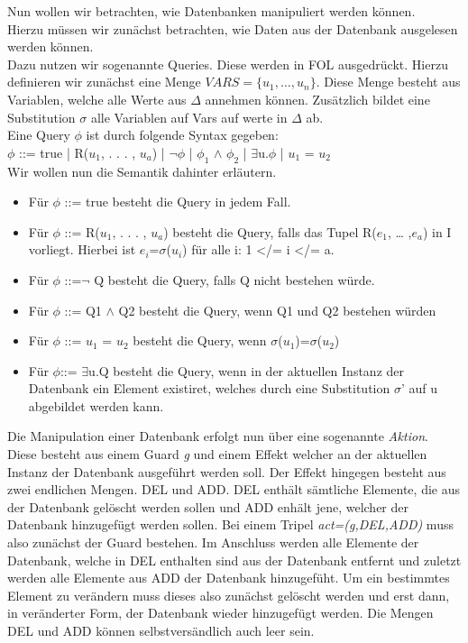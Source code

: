 Nun wollen wir betrachten, wie Datenbanken manipuliert werden können.\\
Hierzu müssen wir zunächst betrachten, wie Daten aus der Datenbank ausgelesen werden können.\\
Dazu nutzen wir sogenannte Queries. Diese werden in FOL ausgedrückt. Hierzu definieren wir zunächst eine Menge $VARS = \{u_1,…,u_n\}$. Diese Menge besteht aus Variablen, welche alle Werte aus ${\Delta}$ annehmen können. Zusätzlich bildet eine Substitution ${\sigma}$ alle Variablen auf Vars auf werte in ${\Delta}$ ab. \\
 Eine Query ${\phi}$ ist durch folgende Syntax gegeben: \\
${\phi}$ ::= true | R($u_1$, . . . , $u_a$) | ${\neg}{\phi}$ | ${\phi}_1$ $\wedge$ ${\phi}_2$ | $\exists$u.${\phi}$ | $u_1$ = $u_2$ \\
Wir wollen nun die Semantik dahinter erläutern.
\begin{itemize}
\item Für ${\phi}$ ::= true besteht die Query in jedem Fall.
\item Für ${\phi}$ ::= R($u_1$, . . . , $u_a$) besteht die Query, falls das Tupel R($e_1$, … ,$e_a$) in I vorliegt. Hierbei ist $e_i$=${\sigma}$($u_i$) für alle i: 1 </= i </= a.
\item Für ${\phi}$ ::=${\neg}$ Q besteht die Query, falls Q nicht bestehen würde. 
\item Für ${\phi}$ ::= Q1 $\wedge$ Q2 besteht die Query, wenn Q1 und Q2  bestehen würden
\item Für ${\phi}$ ::= $u_1$ = $u_2$  besteht die Query, wenn ${\sigma}$($u_1$)=${\sigma}$($u_2$)
\item Für ${\phi}$::= $\exists$u.Q besteht die Query, wenn in der aktuellen Instanz der Datenbank ein Element existiret, welches durch eine Substitution  ${\sigma}$' auf u abgebildet werden kann. 
\end{itemize}
Die Manipulation einer Datenbank erfolgt nun über eine sogenannte \textit{Aktion}. Diese besteht aus einem Guard \textit{g} und einem Effekt welcher an der aktuellen Instanz der Datenbank ausgeführt werden soll. Der Effekt hingegen besteht aus zwei endlichen Mengen. DEL und ADD. DEL enthält sämtliche Elemente, die aus der Datenbank gelöscht werden sollen und ADD enhält jene, welcher der Datenbank hinzugefügt werden sollen. Bei einem Tripel \textit{act=(g,DEL,ADD)} muss also zunächst der Guard bestehen. Im Anschluss werden alle Elemente der Datenbank, welche in DEL enthalten sind aus der Datenbank entfernt und zuletzt werden alle Elemente aus ADD der Datenbank hinzugefüht. Um ein bestimmtes Element zu verändern muss dieses also zunächst gelöscht werden und erst dann, in veränderter Form, der Datenbank wieder hinzugefügt werden. Die Mengen DEL und ADD können selbstversändlich auch leer sein.
